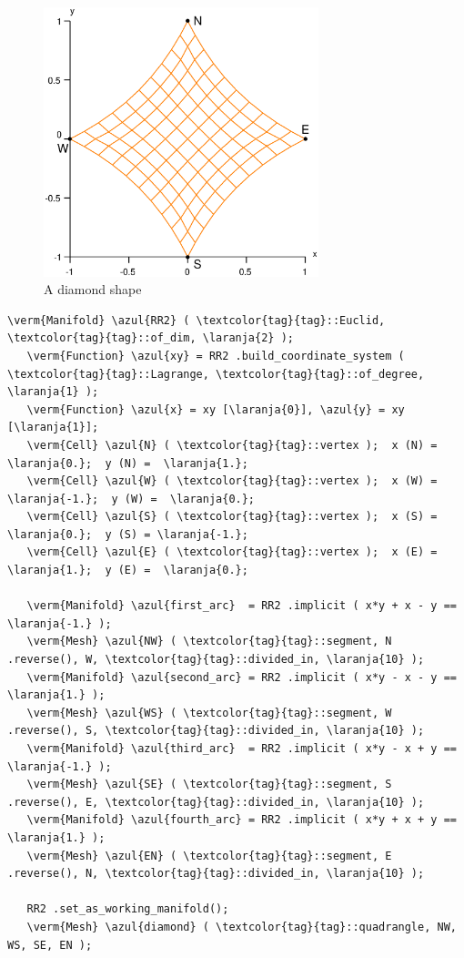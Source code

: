 \begin{figure}[ht] \centering
  \includegraphics[width=80mm]{diamond}
  \caption{A diamond shape}
  \label{\numb section 2.\numb fig 10}
\end{figure}

\begin{Verbatim}[commandchars=\\\{\},formatcom=\small\tt,frame=single,
   label=parag-\ref{\numb section 2.\numb parag 10}.cpp,rulecolor=\color{coment},
   baselinestretch=0.94,framesep=2mm]
   \verm{Manifold} \azul{RR2} ( \textcolor{tag}{tag}::Euclid, \textcolor{tag}{tag}::of_dim, \laranja{2} );
   \verm{Function} \azul{xy} = RR2 .build_coordinate_system ( \textcolor{tag}{tag}::Lagrange, \textcolor{tag}{tag}::of_degree, \laranja{1} );
   \verm{Function} \azul{x} = xy [\laranja{0}], \azul{y} = xy [\laranja{1}];
   \verm{Cell} \azul{N} ( \textcolor{tag}{tag}::vertex );  x (N) =  \laranja{0.};  y (N) =  \laranja{1.};
   \verm{Cell} \azul{W} ( \textcolor{tag}{tag}::vertex );  x (W) = \laranja{-1.};  y (W) =  \laranja{0.};
   \verm{Cell} \azul{S} ( \textcolor{tag}{tag}::vertex );  x (S) =  \laranja{0.};  y (S) = \laranja{-1.};
   \verm{Cell} \azul{E} ( \textcolor{tag}{tag}::vertex );  x (E) =  \laranja{1.};  y (E) =  \laranja{0.};

   \verm{Manifold} \azul{first_arc}  = RR2 .implicit ( x*y + x - y == \laranja{-1.} );
   \verm{Mesh} \azul{NW} ( \textcolor{tag}{tag}::segment, N .reverse(), W, \textcolor{tag}{tag}::divided_in, \laranja{10} );
   \verm{Manifold} \azul{second_arc} = RR2 .implicit ( x*y - x - y ==  \laranja{1.} );
   \verm{Mesh} \azul{WS} ( \textcolor{tag}{tag}::segment, W .reverse(), S, \textcolor{tag}{tag}::divided_in, \laranja{10} );
   \verm{Manifold} \azul{third_arc}  = RR2 .implicit ( x*y - x + y == \laranja{-1.} );
   \verm{Mesh} \azul{SE} ( \textcolor{tag}{tag}::segment, S .reverse(), E, \textcolor{tag}{tag}::divided_in, \laranja{10} );
   \verm{Manifold} \azul{fourth_arc} = RR2 .implicit ( x*y + x + y ==  \laranja{1.} );
   \verm{Mesh} \azul{EN} ( \textcolor{tag}{tag}::segment, E .reverse(), N, \textcolor{tag}{tag}::divided_in, \laranja{10} );
   
   RR2 .set_as_working_manifold();
   \verm{Mesh} \azul{diamond} ( \textcolor{tag}{tag}::quadrangle, NW, WS, SE, EN );
\end{Verbatim}

